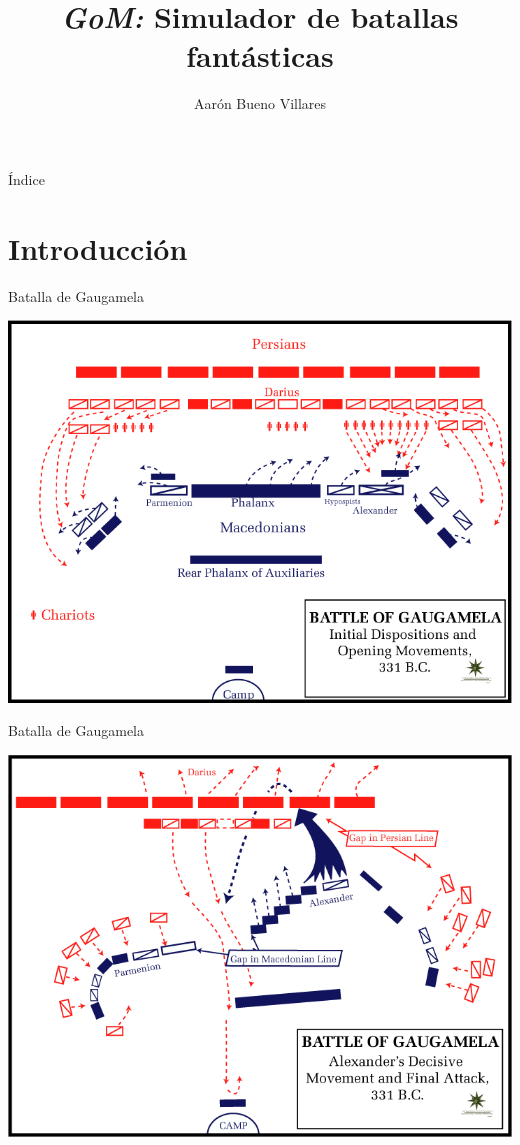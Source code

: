 \documentclass[green, compress]{beamer}
\title{\textit{GoM:} Simulador de batallas fantásticas}
\author[Aarón Bueno Villares]{Aarón Bueno Villares}
\begin{document}
\begin{frame}
	\titlepage
  
\end{frame}

\begin{frame}[allowframebreaks]{Índice}
  \tableofcontents
\end{frame}

\section{Introducción}
\begin{frame}{Batalla de Gaugamela}
\begin{center}
\includegraphics[scale=.3]{imagenes/gaugamela1.png}
\end{center}
\end{frame}

\begin{frame}{Batalla de Gaugamela}
\begin{center}
\includegraphics[scale=.3]{imagenes/gaugamela2.png}
\end{center}
\end{frame}
\end{document}
